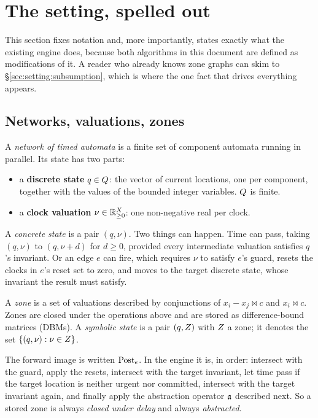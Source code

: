 \section{The setting, spelled out}
\label{sec:setting}

This section fixes notation and, more importantly, states exactly what the existing engine does,
because both algorithms in this document are defined as modifications of it. A reader who already
knows zone graphs can skim to \S\ref{sec:setting:subsumption}, which is where the one fact that
drives everything appears.

\subsection{Networks, valuations, zones}

A \emph{network of timed automata} is a finite set of component automata running in parallel. Its
state has two parts:

\begin{itemize}
  \item a \textbf{discrete state} $q \in Q$: the vector of current locations, one per
        component, together with the values of the bounded integer variables. $Q$ is finite.
  \item a \textbf{clock valuation} $\nu \in \mathbb{R}_{\geq 0}^{X}$: one non-negative real per clock.
\end{itemize}

A \emph{concrete state} is a pair $(q,\nu)$. Two things can happen. Time can pass, taking
$(q,\nu)$ to $(q,\nu+d)$ for $d \ge 0$, provided every intermediate valuation satisfies $q$'s
invariant. Or an edge $e$ can fire, which requires $\nu$ to satisfy $e$'s guard, resets the clocks
in $e$'s reset set to zero, and moves to the target discrete state, whose invariant the result must
satisfy.

A \emph{zone} is a set of valuations described by conjunctions of $x_i - x_j \bowtie c$ and
$x_i \bowtie c$. Zones are closed under the operations above and are stored as difference-bound
matrices (DBMs). A \emph{symbolic state} is a pair $(q, Z)$ with $Z$ a zone; it denotes the set
$\{(q,\nu) : \nu \in Z\}$.

The forward image is written $\mathrm{Post}_e$. In the engine it is, in order: intersect with the guard,
apply the resets, intersect with the target invariant, let time pass if the target location is
neither urgent nor committed, intersect with the target invariant again, and finally apply the
abstraction operator $\mathfrak{a}$ described next. So a stored zone is always \emph{closed under delay}
and always \emph{abstracted}.

